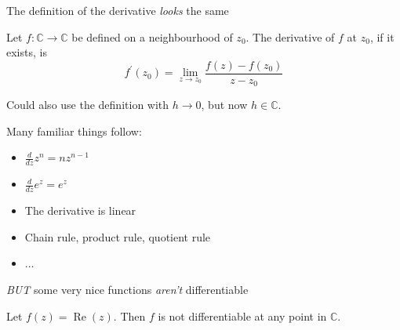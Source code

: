 \documentclass{beamer}
\newcommand{\C}{\mathbb{C}}
\DeclareMathOperator{\Real}{Re}
\begin{document}
\begin{frame}{The definition of the derivative \emph{looks} the same}
\begin{definition} Let $f:\C\to \C$ be defined on a neighbourhood of $z_0$.  The derivative of $f$ at $z_0$, if it exists, is 
$$f^\prime(z_0)=\lim_{z\to z_0} \frac{f(z)-f(z_0)}{z-z_0}$$
\end{definition}
Could also use the definition with $h\to 0$, but now $h\in\C$.
\begin{block}{Many familiar things follow:}
\begin{itemize}
\item $\frac{d}{dz} z^n=nz^{n-1}$
\item $\frac{d}{dz} e^z=e^z$
\item The derivative is linear
\item Chain rule, product rule, quotient rule
\item $\dots$
\end{itemize}
\end{block}
\end{frame}

\begin{frame}[t]{\emph{BUT} some very nice functions \emph{aren't} differentiable}
\begin{example}Let $f(z)=\Real(z)$.  Then $f$ is not differentiable at any point in $\C$.
\end{example}

\end{frame}
\end{document}
